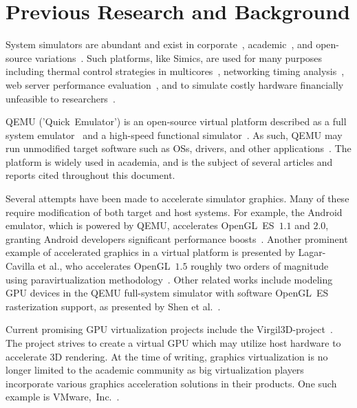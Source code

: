 
\section{Previous Research and Background}
\label{sec:previousresearch}
System simulators are abundant and exist in corporate~, academic~, and open-source variations~.
Such platforms, like Simics, are used for many purposes including thermal control strategies in multicores~, networking timing analysis~, web server performance evaluation~, and to simulate costly hardware financially unfeasible to researchers~.

QEMU ('Quick~Emulator') is an open-source virtual platform described as a full system emulator~ and a high-speed functional simulator~.
As such, QEMU may run unmodified target software such as OSs, drivers, and other applications~.
The platform is widely used in academia, and is the subject of several articles and reports cited throughout this document.

Several attempts have been made to accelerate simulator graphics.
Many of these require modification of both target and host systems.
For example, the Android emulator, which is powered by QEMU, accelerates OpenGL~ES~$1.1$ and $2.0$, granting Android developers significant performance boosts~.
Another prominent example of accelerated graphics in a virtual platform is presented by Lagar-Cavilla et al., who accelerates OpenGL~$1.5$ roughly two orders of magnitude using paravirtualization methodology~.
Other related works include modeling GPU devices in the QEMU full-system simulator with software OpenGL~ES rasterization support, as presented by Shen et al.~.

Current promising GPU virtualization projects include the Virgil3D-project~.
The project strives to create a virtual GPU which may utilize host hardware to accelerate 3D rendering.
At the time of writing, graphics virtualization is no longer limited to the academic community as big virtualization players incorporate various graphics acceleration solutions in their products.
One such example is VMware,~Inc.~.

